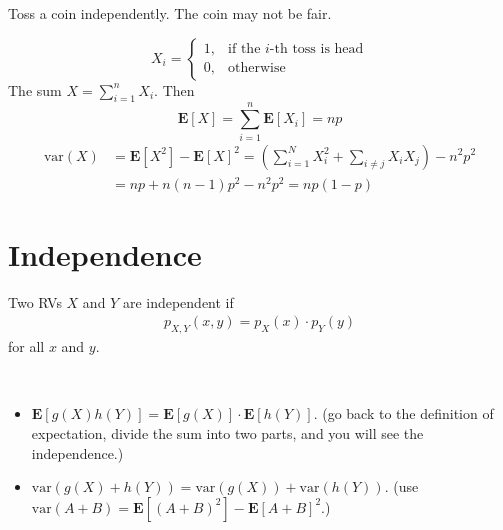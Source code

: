 \begin{example}
    Toss a coin independently. The coin may not be fair. 
    \begin{solution}
        \begin{equation}
            X_i = \begin{cases}
                1, & \text{if the $i$-th toss is head} \\ 
                0, & \text{otherwise}
            \end{cases}
        \end{equation}
        The sum $X = \sum_{i=1}^n X_i$. Then 
        \begin{equation}
            \mathbf{E}[X] = \sum_{i=1}^n \mathbf{E}[X_i] = np
        \end{equation}
        \begin{equation}
        \begin{aligned}
            \text{var}(X) &= \mathbf{E}[X^2] - \mathbf{E}[X]^2 = (\sum_{i=1}^{N} X_i^2 + \sum_{i \neq j} X_i X_j) - n^2 p^2 \\
            &= np + n(n-1)p^2 - n^2 p^2 = np(1-p)
        \end{aligned}
        \end{equation}
    \end{solution}
\end{example}

\section{Independence}
\begin{definition}
    Two RVs $X$ and $Y$ are independent if
    \begin{align}
        p_{X, Y}(x, y) = p_{X}(x) \cdot p_{Y}(y)
    \end{align}
    for all $x$ and $y$.
\end{definition}
\begin{property} ~
    \begin{itemize}
        \item $\mathbf{E}[g(X)h(Y)] = \mathbf{E}[g(X)] \cdot \mathbf{E}[h(Y)]$. (go back to the definition of expectation, divide the sum into two parts, and you will see the independence.)
        \item $\text{var}(g(X) + h(Y)) = \text{var}(g(X)) + \text{var}(h(Y))$. (use $\text{var}(A + B) = \mathbf{E}[(A + B)^2] - \mathbf{E}[A + B]^2$.)
    \end{itemize}
\end{property}

